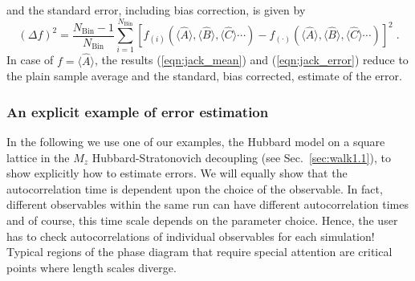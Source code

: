 and the standard error, including bias correction, is given by
\begin{equation}
\label{eqn:jack_error}
(\Delta f)^{2} = 
\frac{N_{\text{Bin}}-1}{N_{\text{Bin}}} \sum\limits_{i=1}^{N_{\text{Bin}}}
\left[f_{(i)}(\langle \hat{A} \rangle, \langle \hat{B} \rangle, \langle \hat{C} \rangle  \cdots)
- f_{(\cdot)}(\langle \hat{A} \rangle, \langle \hat{B} \rangle, \langle \hat{C} \rangle  \cdots)\right]^{2}\;.
\end{equation}
In case of $f=\langle\hat A\rangle$, the results (\ref{eqn:jack_mean}) and (\ref{eqn:jack_error}) reduce to the plain sample average and the standard, bias corrected, estimate of the error.

%
\subsubsection{An explicit example of error estimation}\label{sec:autocorr}
%
In the following we use one of our examples, the Hubbard model on a square lattice in the $M_z$ Hubbard-Stratonovich decoupling (see Sec.~\ref{sec:walk1.1}), to show explicitly how to estimate errors.  We will equally show that the  autocorrelation time is dependent upon the  choice of the observable.  In fact, different observables within the same run can have different autocorrelation times  and of course, this time scale depends on the  parameter choice.  Hence, the user has to check  autocorrelations of individual observables for each simulation!  Typical regions of the phase diagram that require special attention are critical points  where length scales diverge.  

